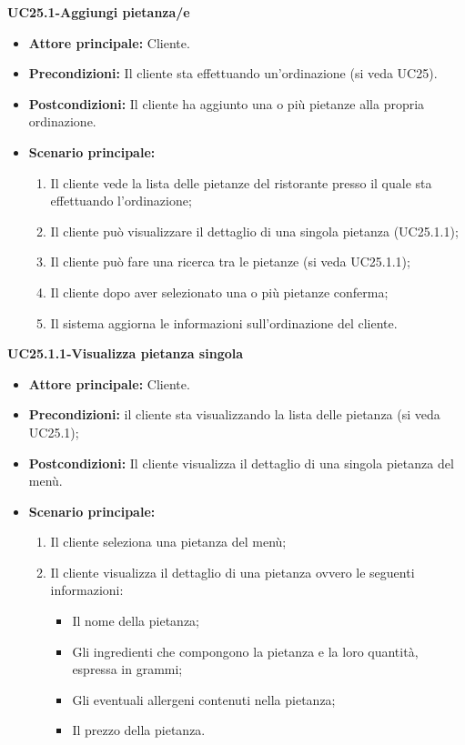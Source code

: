 \textbf{UC25.1-Aggiungi pietanza/e}
\begin{itemize}
\item \textbf{Attore principale:} Cliente.
\item \textbf{Precondizioni:} Il cliente sta effettuando un'ordinazione (si veda UC25).
\item \textbf{Postcondizioni:} Il cliente ha aggiunto una o più pietanze alla propria ordinazione.
\item \textbf{Scenario principale:}
\begin{enumerate}
    \item Il cliente vede la lista delle pietanze del ristorante presso il quale sta effettuando l'ordinazione;
    \item Il cliente può visualizzare il dettaglio di una singola pietanza (UC25.1.1);
    \item Il cliente può fare una ricerca tra le pietanze (si veda UC25.1.1);
    \item Il cliente dopo aver selezionato una o più pietanze conferma;
    \item Il sistema aggiorna le informazioni sull'ordinazione del cliente.
\end{enumerate}
\end{itemize}

\textbf{UC25.1.1-Visualizza pietanza singola}
\begin{itemize}
\item \textbf{Attore principale:} Cliente.
\item \textbf{Precondizioni:} il cliente sta visualizzando la lista delle pietanza (si veda UC25.1);
\item \textbf{Postcondizioni:} Il cliente visualizza il dettaglio di una singola pietanza del menù.
\item \textbf{Scenario principale:}
\begin{enumerate}
    \item Il cliente seleziona una pietanza del menù;
    \item Il cliente visualizza il dettaglio di una pietanza ovvero le seguenti informazioni:
    \begin{itemize}
        \item Il nome della pietanza;
        \item Gli ingredienti che compongono la pietanza e la loro quantità, espressa in grammi;
        \item Gli eventuali allergeni contenuti nella pietanza;
        \item Il prezzo della pietanza.
    \end{itemize}
\end{enumerate}
\end{itemize}

